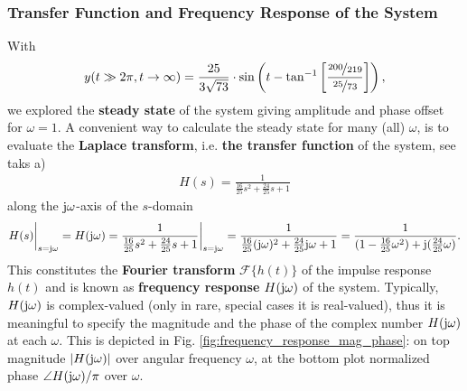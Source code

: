 \documentclass[11pt,a4paper,DIV=12]{scrartcl}
\begin{document}
\subsubsection{Transfer Function and Frequency Response of the System}
%
With 
\begin{align}
y(t\gg 2\pi, t\to\infty) = \frac{25}{3 \sqrt{73}}\cdot
\sin\left(t-\tan^{-1}
\left[\frac{\nicefrac{200}{219}}{\nicefrac{25}{73}}\right]\right),
\end{align}
we explored the \textbf{steady state} of the system giving
amplitude and phase offset for $\omega=1$.
%
A convenient way to calculate the steady state for many (all) $\omega$, is to evaluate
the \textbf{Laplace transform}, i.e. \textbf{the transfer function} of the system,
see taks a)
\begin{align}
H(s) = \frac{1}{\frac{16}{25} s^2 + \frac{24}{25} s + 1}
\end{align}
along the
$\im\omega$-axis of the $s$-domain
\begin{align}
H(s)\bigg|_{s=\im\omega} =
H(\im\omega)
= \frac{1}{\frac{16}{25} s^2 + \frac{24}{25} s + 1}\bigg|_{s=\im\omega}
= \frac{1}{\frac{16}{25} (\im\omega)^2 + \frac{24}{25} \im\omega + 1}
= \frac{1}{ (1 -\frac{16}{25} \omega^2) + \im (\frac{24}{25} \omega)}.
\end{align}
This constitutes the \textbf{Fourier transform} $\mathcal{F}\{h(t)\}$
of the impulse response $h(t)$ and is known as
\textbf{frequency response} $H(\im\omega)$ of the system.
%
Typically, $H(\im\omega)$ is complex-valued (only in rare, special cases
it is real-valued), thus it is meaningful to specify the magnitude and the phase
of the complex number $H(\im\omega)$ at each $\omega$.
%
This is depicted in Fig. \ref{fig:frequency_response_mag_phase}: on top magnitude
$|H(\im\omega)|$ over angular frequency $\omega$, at the bottom plot normalized
phase $\angle H(\im\omega) / \pi$ over $\omega$.
%
%
\end{document}
